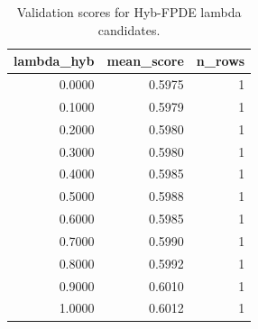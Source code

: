 \begin{table}[t]
\caption{Validation scores for Hyb-FPDE lambda candidates.}
\label{tab:lambda_distribution_computed}
\centering
\begin{tabular}{rrr}
\toprule
lambda\_hyb & mean\_score & n\_rows \\
\midrule
0.0000 & 0.5975 & 1 \\
0.1000 & 0.5979 & 1 \\
0.2000 & 0.5980 & 1 \\
0.3000 & 0.5980 & 1 \\
0.4000 & 0.5985 & 1 \\
0.5000 & 0.5988 & 1 \\
0.6000 & 0.5985 & 1 \\
0.7000 & 0.5990 & 1 \\
0.8000 & 0.5992 & 1 \\
0.9000 & 0.6010 & 1 \\
1.0000 & 0.6012 & 1 \\
\bottomrule
\end{tabular}

\end{table}
